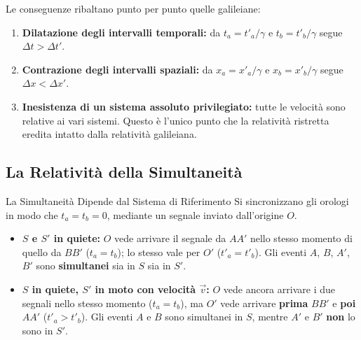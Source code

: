 Le conseguenze ribaltano punto per punto quelle galileiane:
\begin{enumerate}
    \item \textbf{Dilatazione degli intervalli temporali:} da $t_a = t'_a/\gamma$ e $t_b = t'_b/\gamma$ segue $\Delta t > \Delta t'$.
    \item \textbf{Contrazione degli intervalli spaziali:} da $x_a = x'_a/\gamma$ e $x_b = x'_b/\gamma$ segue $\Delta x < \Delta x'$.
    \item \textbf{Inesistenza di un sistema assoluto privilegiato:} tutte le velocità sono relative ai vari sistemi. Questo è l'unico punto che la relatività ristretta eredita intatto dalla relatività galileiana.
\end{enumerate}

\subsection{La Relatività della Simultaneità}

\begin{osservazione}{La Simultaneità Dipende dal Sistema di Riferimento}
Si sincronizzano gli orologi in modo che $t_a = t_b = 0$, mediante un segnale inviato dall'origine $O$.
\begin{itemize}[leftmargin=1.4em]
    \item \textbf{$S$ e $S'$ in quiete:} $O$ vede arrivare il segnale da $AA'$ nello stesso momento di quello da $BB'$ ($t_a = t_b$); lo stesso vale per $O'$ ($t'_a = t'_b$). Gli eventi $A$, $B$, $A'$, $B'$ sono \textbf{simultanei} sia in $S$ sia in $S'$.
    \item \textbf{$S$ in quiete, $S'$ in moto con velocità $\vec{v}$:} $O$ vede ancora arrivare i due segnali nello stesso momento ($t_a = t_b$), ma $O'$ vede arrivare \textbf{prima} $BB'$ e \textbf{poi} $AA'$ ($t'_a > t'_b$). Gli eventi $A$ e $B$ sono simultanei in $S$, mentre $A'$ e $B'$ \textbf{non} lo sono in $S'$.
\end{itemize}
\end{osservazione}

